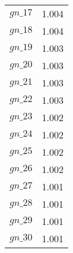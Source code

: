 \begin{center}
\begin{longtable}{cc}
$gn\_17$ 	 & 	 1.004 \\
$gn\_18$ 	 & 	 1.004 \\
$gn\_19$ 	 & 	 1.003 \\
$gn\_20$ 	 & 	 1.003 \\
$gn\_21$ 	 & 	 1.003 \\
$gn\_22$ 	 & 	 1.003 \\
$gn\_23$ 	 & 	 1.002 \\
$gn\_24$ 	 & 	 1.002 \\
$gn\_25$ 	 & 	 1.002 \\
$gn\_26$ 	 & 	 1.002 \\
$gn\_27$ 	 & 	 1.001 \\
$gn\_28$ 	 & 	 1.001 \\
$gn\_29$ 	 & 	 1.001 \\
$gn\_30$ 	 & 	 1.001 \\
\bottomrule%
\end{longtable}
\end{center}
